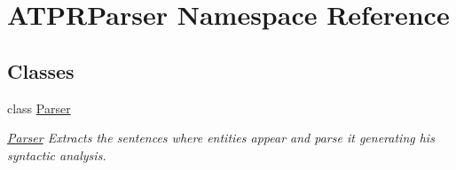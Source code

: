 \hypertarget{namespace_a_t_p_r_parser}{}\section{A\+T\+P\+R\+Parser Namespace Reference}
\label{namespace_a_t_p_r_parser}
\subsection*{Classes}
\begin{DoxyCompactItemize}
\item 
class \hyperlink{class_a_t_p_r_parser_1_1_parser}{Parser}
\begin{DoxyCompactList}\small\item\em \hyperlink{class_a_t_p_r_parser_1_1_parser}{Parser} Extracts the sentences where entities appear and parse it generating his syntactic analysis. \end{DoxyCompactList}\end{DoxyCompactItemize}
